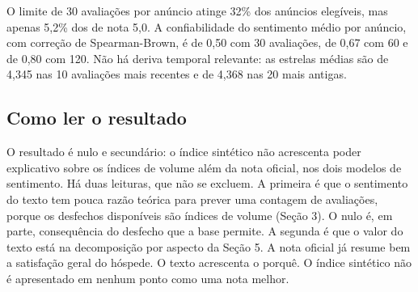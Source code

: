 O limite de 30 avaliações por anúncio atinge 32\% dos anúncios elegíveis, mas apenas 5,2\% dos de nota 5,0. A confiabilidade do sentimento médio por anúncio, com correção de Spearman-Brown, é de 0,50 com 30 avaliações, de 0,67 com 60 e de 0,80 com 120. Não há deriva temporal relevante: as estrelas médias são de 4,345 nas 10 avaliações mais recentes e de 4,368 nas 20 mais antigas.

\subsection{Como ler o resultado}

O resultado é nulo e secundário: o índice sintético não acrescenta poder explicativo sobre os índices de volume além da nota oficial, nos dois modelos de sentimento. Há duas leituras, que não se excluem. A primeira é que o sentimento do texto tem pouca razão teórica para prever uma contagem de avaliações, porque os desfechos disponíveis são índices de volume (Seção 3). O nulo é, em parte, consequência do desfecho que a base permite. A segunda é que o valor do texto está na decomposição por aspecto da Seção 5. A nota oficial já resume bem a satisfação geral do hóspede. O texto acrescenta o porquê. O índice sintético não é apresentado em nenhum ponto como uma nota melhor.
